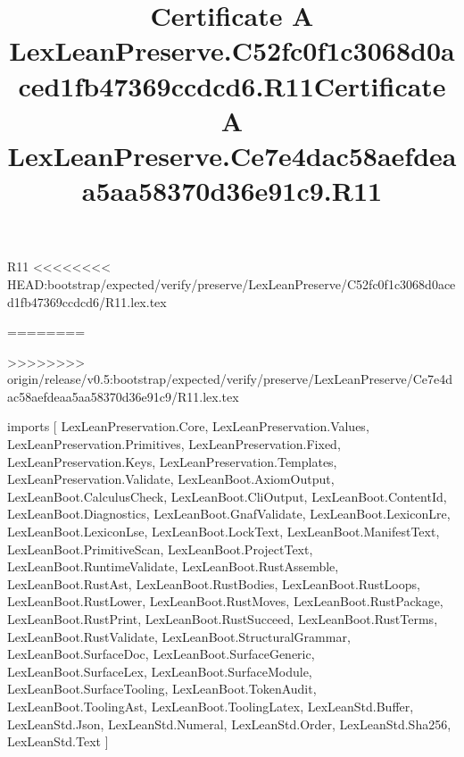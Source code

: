 \begin{lexlean}{R11}
<<<<<<<< HEAD:bootstrap/expected/verify/preserve/LexLeanPreserve/C52fc0f1c3068d0aced1fb47369ccdcd6/R11.lex.tex
\title{Certificate A LexLeanPreserve.C52fc0f1c3068d0aced1fb47369ccdcd6.R11}
========
\title{Certificate A LexLeanPreserve.Ce7e4dac58aefdeaa5aa58370d36e91c9.R11}
>>>>>>>> origin/release/v0.5:bootstrap/expected/verify/preserve/LexLeanPreserve/Ce7e4dac58aefdeaa5aa58370d36e91c9/R11.lex.tex
\begin{coremodule}
imports [
  LexLeanPreservation.Core,
  LexLeanPreservation.Values,
  LexLeanPreservation.Primitives,
  LexLeanPreservation.Fixed,
  LexLeanPreservation.Keys,
  LexLeanPreservation.Templates,
  LexLeanPreservation.Validate,
  LexLeanBoot.AxiomOutput,
  LexLeanBoot.CalculusCheck,
  LexLeanBoot.CliOutput,
  LexLeanBoot.ContentId,
  LexLeanBoot.Diagnostics,
  LexLeanBoot.GnafValidate,
  LexLeanBoot.LexiconLre,
  LexLeanBoot.LexiconLse,
  LexLeanBoot.LockText,
  LexLeanBoot.ManifestText,
  LexLeanBoot.PrimitiveScan,
  LexLeanBoot.ProjectText,
  LexLeanBoot.RuntimeValidate,
  LexLeanBoot.RustAssemble,
  LexLeanBoot.RustAst,
  LexLeanBoot.RustBodies,
  LexLeanBoot.RustLoops,
  LexLeanBoot.RustLower,
  LexLeanBoot.RustMoves,
  LexLeanBoot.RustPackage,
  LexLeanBoot.RustPrint,
  LexLeanBoot.RustSucceed,
  LexLeanBoot.RustTerms,
  LexLeanBoot.RustValidate,
  LexLeanBoot.StructuralGrammar,
  LexLeanBoot.SurfaceDoc,
  LexLeanBoot.SurfaceGeneric,
  LexLeanBoot.SurfaceLex,
  LexLeanBoot.SurfaceModule,
  LexLeanBoot.SurfaceTooling,
  LexLeanBoot.TokenAudit,
  LexLeanBoot.ToolingAst,
  LexLeanBoot.ToolingLatex,
  LexLeanStd.Buffer,
  LexLeanStd.Json,
  LexLeanStd.Numeral,
  LexLeanStd.Order,
  LexLeanStd.Sha256,
  LexLeanStd.Text
]


\end{coremodule}
\end{lexlean}
